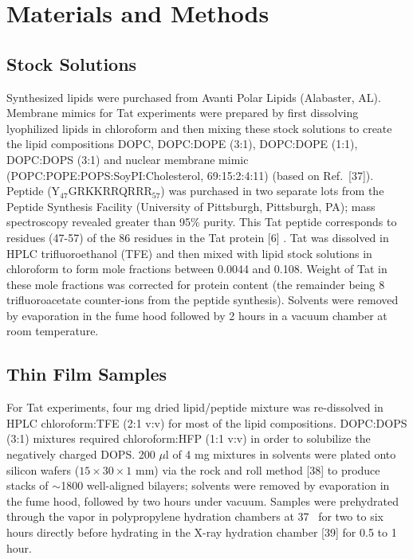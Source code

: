 \section{Materials and Methods}
\subsection{Stock Solutions}
Synthesized lipids were purchased from Avanti Polar Lipids (Alabaster, AL). 
Membrane mimics for Tat experiments were prepared by first 
dissolving lyophilized lipids in chloroform and then mixing these stock 
solutions to create the lipid compositions
DOPC, DOPC:DOPE (3:1), DOPC:DOPE (1:1), DOPC:DOPS (3:1) and nuclear membrane
mimic (POPC:POPE:POPS:SoyPI:Cholesterol, 69:15:2:4:11) (based on Ref.~[37]\cite{}). 
Peptide (Y$_{47}$GRKKRRQRRR$_{57}$) was purchased in two separate lots from the 
Peptide Synthesis Facility (University of Pittsburgh, Pittsburgh, PA); 
mass spectroscopy revealed greater than 95\% purity. 
This Tat peptide corresponds to residues (47-57) of the 86 residues in the Tat 
protein [6] \cite{}. 
Tat was dissolved in HPLC trifluoroethanol (TFE) and then mixed with lipid 
stock solutions in chloroform to form mole fractions between 0.0044 and 0.108. 
Weight of Tat in these mole fractions was corrected for protein content 
(the remainder being 8 trifluoroacetate counter-ions from the peptide synthesis). 
Solvents were removed by evaporation in the fume hood followed
by 2 hours in a vacuum chamber at room temperature.

\subsection{Thin Film Samples}
For Tat experiments, four mg dried lipid/peptide mixture was re-dissolved 
in HPLC chloroform:TFE (2:1 v:v) for most of the lipid compositions. 
DOPC:DOPS (3:1) mixtures required chloroform:HFP (1:1 v:v) in order to 
solubilize the negatively charged DOPS. 200 $\mu$l of 4 mg mixtures in 
solvents were plated onto silicon wafers ($15\times 30\times 1$ mm) via 
the rock and roll method [38] to produce stacks of $\sim$1800 well-aligned 
bilayers; solvents were removed by evaporation in the fume hood, followed by 
two hours under vacuum. Samples were prehydrated through the
vapor in polypropylene hydration chambers at 37 \textcelsius\ for two to six 
hours directly before hydrating in the X-ray hydration chamber [39] for 
0.5 to 1 hour. 



